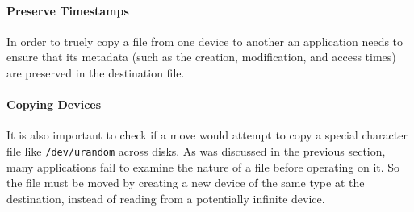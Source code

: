 \paragraph{Preserve Timestamps}

In order to truely copy a file from one device
to another an application needs to ensure that its metadata (such as the 
creation, modification, and access times) are preserved in the destination 
file.  

\paragraph{Copying Devices}

It is also important to check if a move would attempt to copy a
special character file like {\tt /dev/urandom} across disks.  As was discussed
in the previous section, many applications fail to examine the nature of a file
before operating on it.  So the file must be moved by creating a new device
of the same type at the destination, instead of reading from a potentially 
infinite device.


